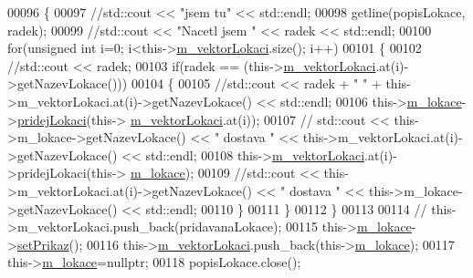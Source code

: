 \begin{DoxyCode}
00096         \{
00097             \textcolor{comment}{//std::cout << "jsem tu" << std::endl;}
00098             getline(popisLokace, radek);
00099                                 \textcolor{comment}{//std::cout << "Nacetl jsem " << radek << std::endl;}
00100             \textcolor{keywordflow}{for}(\textcolor{keywordtype}{unsigned} \textcolor{keywordtype}{int} i=0; i<this->\hyperlink{classIceAge_1_1BuilderLokace_a110ada142d159f68fb82382a47d088f4}{m\_vektorLokaci}.size(); i++)
00101             \{
00102                 \textcolor{comment}{//std::cout << radek;}
00103                 \textcolor{keywordflow}{if}(radek == (this->\hyperlink{classIceAge_1_1BuilderLokace_a110ada142d159f68fb82382a47d088f4}{m\_vektorLokaci}.at(i)->getNazevLokace()))
00104                 \{
00105                                 \textcolor{comment}{//std::cout << radek + " " + this->m\_vektorLokaci.at(i)->getNazevLokace()
       << std::endl;}
00106                     this->\hyperlink{classIceAge_1_1BuilderLokace_aad0fb17bf38c03cd767e100758348f24}{m\_lokace}->\hyperlink{classIceAge_1_1Lokace_a0d506324f571f77f0daf14de00c548b6}{pridejLokaci}(this->
      \hyperlink{classIceAge_1_1BuilderLokace_a110ada142d159f68fb82382a47d088f4}{m\_vektorLokaci}.at(i));
00107                                 \textcolor{comment}{// std::cout << this->m\_lokace->getNazevLokace() << " dostava " <<
       this->m\_vektorLokaci.at(i)->getNazevLokace() << std::endl;}
00108                     this->\hyperlink{classIceAge_1_1BuilderLokace_a110ada142d159f68fb82382a47d088f4}{m\_vektorLokaci}.at(i)->pridejLokaci(this->
      \hyperlink{classIceAge_1_1BuilderLokace_aad0fb17bf38c03cd767e100758348f24}{m\_lokace});
00109                                 \textcolor{comment}{//std::cout << this->m\_vektorLokaci.at(i)->getNazevLokace() << " dostava "
       << this->m\_lokace->getNazevLokace() << std::endl;}
00110                 \}
00111             \}
00112         \}
00113 
00114 \textcolor{comment}{//        this->m\_vektorLokaci.push\_back(pridavanaLokace);}
00115         this->\hyperlink{classIceAge_1_1BuilderLokace_aad0fb17bf38c03cd767e100758348f24}{m\_lokace}->\hyperlink{classIceAge_1_1Lokace_a27bac7797acadfebe3aaf61a69fdda2d}{setPrikaz}();    
00116         this->\hyperlink{classIceAge_1_1BuilderLokace_a110ada142d159f68fb82382a47d088f4}{m\_vektorLokaci}.push\_back(this->\hyperlink{classIceAge_1_1BuilderLokace_aad0fb17bf38c03cd767e100758348f24}{m\_lokace}); 
00117         this->\hyperlink{classIceAge_1_1BuilderLokace_aad0fb17bf38c03cd767e100758348f24}{m\_lokace}=\textcolor{keyword}{nullptr};
00118         popisLokace.close(); 

\end{DoxyCode}

